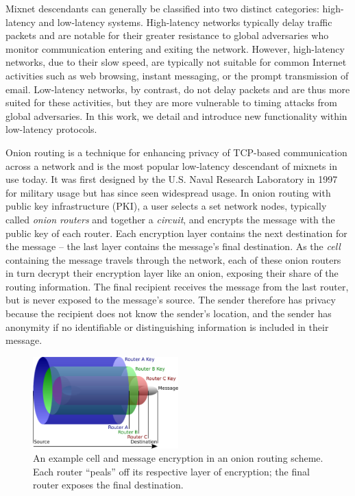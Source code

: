Mixnet descendants can generally be classified into two distinct categories: high-latency and low-latency systems. High-latency networks typically delay traffic packets and are notable for their greater resistance to global adversaries who monitor communication entering and exiting the network. However, high-latency networks, due to their slow speed, are typically not suitable for common Internet activities such as web browsing, instant messaging, or the prompt transmission of email. Low-latency networks, by contrast, do not delay packets and are thus more suited for these activities, but they are more vulnerable to timing attacks from global adversaries.\cite{dingledine2004tor} In this work, we detail and introduce new functionality within low-latency protocols.

Onion routing is a technique for enhancing privacy of TCP-based communication across a network and is the most popular low-latency descendant of mixnets in use today. It was first designed by the U.S. Naval Research Laboratory in 1997 for military usage \cite{syverson1997anonymous}\cite{reed1998anonymous} but has since seen widespread usage. In onion routing with public key infrastructure (PKI), a user selects a set network nodes, typically called \emph{onion routers} and together a \emph{circuit}, and encrypts the message with the public key of each router. Each encryption layer contains the next destination for the message -- the last layer contains the message's final destination. As the \emph{cell} containing the message travels through the network, each of these onion routers in turn decrypt their encryption layer like an onion, exposing their share of the routing information. The final recipient receives the message from the last router, but is never exposed to the message's source.\cite{syverson2011peel} The sender therefore has privacy because the recipient does not know the sender's location, and the sender has anonymity if no identifiable or distinguishing information is included in their message.

\begin{figure}[htbp]
	\centering
	\includegraphics[width=0.5\textwidth]{images/onion-diagram.eps}
	\caption{An example cell and message encryption in an onion routing scheme. Each router ``peals'' off its respective layer of encryption; the final router exposes the final destination.}
\end{figure}

